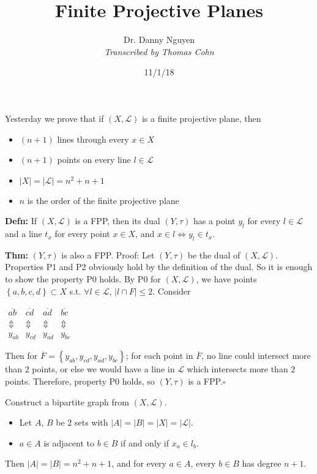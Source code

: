 \documentclass[10pt,letterpaper]{article}
\author{Dr. Danny Nguyen\\ \small\textit{Transcribed by Thomas Cohn}}
\title{Finite Projective Planes}
\date{11/1/18} %
\newcommand{\n}{\hfill\break}
\newcommand{\defn}[1]{\par\noindent\settowidth{\hangindent}{\textbf{Defn: }}\textbf{Defn: }#1\n}
\newcommand{\thm}[1]{\par\noindent\settowidth{\hangindent}{\textbf{Thm: }}\textbf{Thm: }#1\n}
\newcommand{\proven}{\;$\square$\n}
\newcommand{\inlineeq}[1]{\centerline{$\displaystyle #1$}}
\newcommand{\card}[1]{\left|#1\right|}
\newcommand{\set}[1]{\left\{#1\right\}}
\newcommand{\st}{s.t.}
\begin{document}
\maketitle
\setlength\RaggedRightParindent{\parindent}
\RaggedRight

\par\noindent Yesterday we prove that if $(X,\mathscr{L})$ is a finite projective plane, then
\begin{itemize}
	\item $(n+1)$ lines through every $x\in{}X$
	\item $(n+1)$ points on every line $l\in\mathscr{L}$
	\item $\card{X}=\card{\mathscr{L}}=n^{2}+n+1$
	\item $n$ is the order of the finite projective plane
\end{itemize}

\defn{If $(X,\mathscr{L})$ is a FPP, then its dual $(Y,\tau)$ has a point $y_{l}$ for every $l\in\mathscr{L}$ and a line $t_{x}$ for every point $x\in{}X$, and $x\in{}l\Leftrightarrow{}y_{l}\in{}t_{x}$.}

\thm{$(Y,\tau)$ is also a FPP.\n
Proof: Let $(Y,\tau)$ be the dual of $(X,\mathscr{L})$. Properties P1 and P2 obviously hold by the definition of the dual. So it is enough to show the property P0 holds.\n
By P0 for $(X,\mathscr{L})$, we have points $\set{a,b,c,d}\subset{}X$ \st{} $\forall{}l\in\mathscr{L}$, $\card{l\cap{}F}\le{}2$. Consider\n
\inlineeq{\begin{array}{cccc}\overline{ab} & \overline{cd} & \overline{ad} & \overline{bc}\\ \Updownarrow & \Updownarrow & \Updownarrow & \Updownarrow\\ y_{\overline{ab}} & y_{\overline{cd}} & y_{\overline{ad}} & y_{\overline{bc}}\end{array}}
Then for $\overline{F}=\set{y_{\overline{ab}},y_{\overline{cd}},y_{\overline{ad}},y_{\overline{bc}}}$; for each point in $\overline{F}$, no line could intersect more than $2$ points, or else we would have a line in $\mathscr{L}$ which intersects more than $2$ points.\n
Therefore, property P0 holds, so $(Y,\tau)$ is a FPP.\proven}

\par\noindent Construct a bipartite graph from $(X,\mathscr{L})$.\n
\begin{itemize}
	\item Let $A$, $B$ be $2$ sets with $\card{A}=\card{B}=\card{X}=\card{\mathscr{L}}$.
	\item $a\in{}A$ is adjacent to $b\in{}B$ if and only if $x_{a}\in{}l_{b}$.
\end{itemize}
\par\noindent Then $\card{A}=\card{B}=n^{2}+n+1$, and for every $a\in{}A$, every $b\in{}B$ has degree $n+1$.\n
\end{document}

